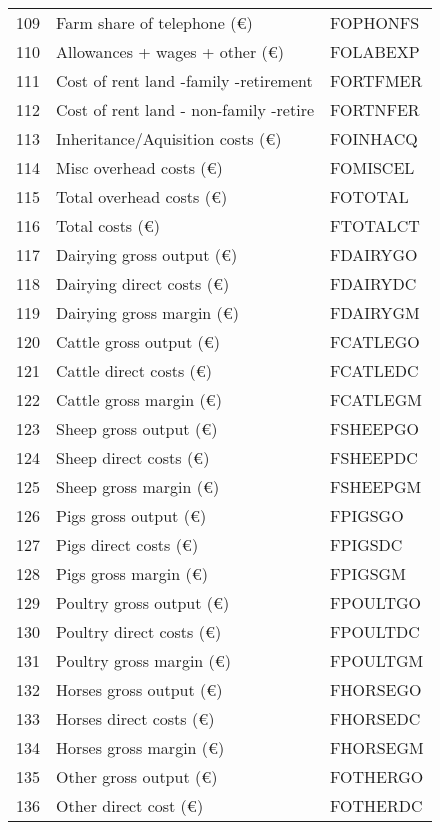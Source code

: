 \documentclass{article}\usepackage{graphicx, color}
\begin{document}
\begin{flushleft}
\begin{table}[ht]
\begin{center}
\begin{tabular}{rll}
  109 & Farm share of telephone      (€) & FOPHONFS \\ 
  110 & Allowances + wages + other   (€) & FOLABEXP \\ 
  111 & Cost of rent land -family -retirement & FORTFMER \\ 
  112 & Cost of rent land - non-family -retire & FORTNFER \\ 
  113 & Inheritance/Aquisition costs (€) & FOINHACQ \\ 
  114 & Misc overhead costs          (€) & FOMISCEL \\ 
  115 & Total overhead costs         (€) & FOTOTAL \\ 
  116 & Total costs                  (€) & FTOTALCT \\ 
  117 & Dairying gross output    (€) & FDAIRYGO \\ 
  118 & Dairying direct costs    (€) & FDAIRYDC \\ 
  119 & Dairying gross margin    (€) & FDAIRYGM \\ 
  120 & Cattle   gross output    (€) & FCATLEGO \\ 
  121 & Cattle   direct costs    (€) & FCATLEDC \\ 
  122 & Cattle   gross margin    (€) & FCATLEGM \\ 
  123 & Sheep    gross output    (€) & FSHEEPGO \\ 
  124 & Sheep    direct costs    (€) & FSHEEPDC \\ 
  125 & Sheep    gross margin    (€) & FSHEEPGM \\ 
  126 & Pigs     gross output    (€) & FPIGSGO \\ 
  127 & Pigs     direct costs    (€) & FPIGSDC \\ 
  128 & Pigs     gross margin    (€) & FPIGSGM \\ 
  129 & Poultry  gross output    (€) & FPOULTGO \\ 
  130 & Poultry  direct costs    (€) & FPOULTDC \\ 
  131 & Poultry  gross margin    (€) & FPOULTGM \\ 
  132 & Horses   gross output    (€) & FHORSEGO \\ 
  133 & Horses   direct costs    (€) & FHORSEDC \\ 
  134 & Horses   gross margin    (€) & FHORSEGM \\ 
  135 & Other    gross output    (€) & FOTHERGO \\ 
  136 & Other    direct cost     (€) & FOTHERDC \\ 

\end{tabular}
\end{center}
\end{table}
\end{flushleft}
\end{document}
